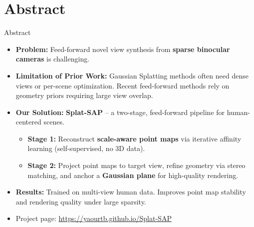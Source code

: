 \section{Abstract}
\begin{frame}{Abstract}
    \begin{itemize}
        \item \textbf{Problem:} Feed-forward novel view synthesis from \textbf{sparse binocular cameras} is challenging.
        \item \textbf{Limitation of Prior Work:} Gaussian Splatting methods often need dense views or per-scene optimization. Recent feed-forward methods rely on geometry priors requiring large view overlap.
        \item \textbf{Our Solution:} \textbf{Splat-SAP} – a two-stage, feed-forward pipeline for human-centered scenes.
        \begin{itemize}
            \item \textbf{Stage 1:} Reconstruct \textbf{scale-aware point maps} via iterative affinity learning (self-supervised, no 3D data).
            \item \textbf{Stage 2:} Project point maps to target view, refine geometry via stereo matching, and anchor a \textbf{Gaussian plane} for high-quality rendering.
        \end{itemize}
        \item \textbf{Results:} Trained on multi-view human data. Improves point map stability and rendering quality under large sparsity.
        \item Project page: \url{https://yaourtb.github.io/Splat-SAP}
    \end{itemize}
\end{frame}


